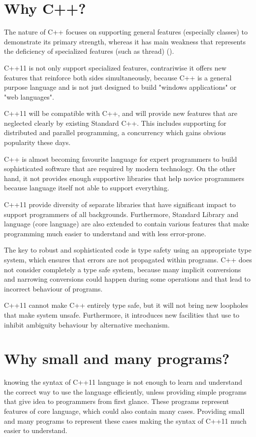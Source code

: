 \documentclass[11pt]{report}
\begin{document}
\section{Why C++?}
\label{sec: why C++}
The nature of C++ focuses on supporting general features (especially classes) to demonstrate its primary strength, whereas it has main weakness that represents the deficiency of specialized features (such as thread) (\cite{Stroustrup:2005:Cpp}).

C++11 is not  only  support specialized features, contrariwise it offers new features that reinforce both sides simultaneously, because C++ is a general purpose language and is not just designed to build "windows applications" or "web languages".

C++11 will be compatible with C++, and will provide new features that are neglected clearly by existing Standard C++. This includes supporting for distributed and parallel programming, a concurrency which gains obvious popularity these days.

C++ is almost becoming favourite language for expert programmers to build sophisticated software that are required by modern technology. On the other hand, it not provides enough supportive libraries that help novice programmers because language itself not able to support everything.

C++11 provide diversity of separate libraries that have significant impact to support programmers of all backgrounds. Furthermore, Standard Library and language (core language) are also extended to contain various features that make programming much easier to understand and with less error-prone. 

The key to robust and sophisticated code is type safety using an appropriate type system, which ensures that errors are not propagated within programs. C++ does not consider completely a type safe system, because many implicit conversions and narrowing conversions could happen during some operations and that lead to incorrect behaviour of programs.

C++11 cannot make C++ entirely type safe, but it will not bring new loopholes that make system unsafe. Furthermore, it introduces new facilities that use to inhibit ambiguity behaviour by alternative mechanism.  


\section{Why small and many programs?}
\label{sec:small and many programs}
knowing the syntax of C++11 language is not enough to learn and understand the correct way to use the language efficiently, unless providing  simple  programs that give idea to programmers from first glance.  These programs represent features of core language, which could also contain many cases. Providing small and many programs to represent these cases making the syntax of C++11 much easier to understand.
\end{document}
